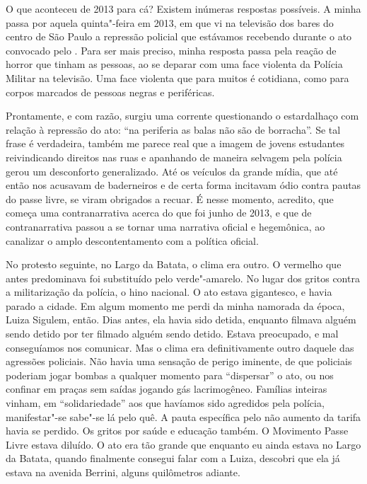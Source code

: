 O que aconteceu de 2013 para cá? Existem inúmeras respostas possíveis. A
minha passa por aquela quinta"-feira em 2013, em que vi na televisão dos
bares do centro de São Paulo a repressão policial que estávamos recebendo
durante o ato convocado pelo . Para ser mais preciso, minha resposta
passa pela reação de horror que tinham as pessoas, ao se deparar com uma
face violenta da Polícia Militar na televisão. Uma face violenta que
para muitos é cotidiana, como para corpos marcados de pessoas
negras e periféricas.

Prontamente, e com razão, surgiu uma corrente questionando o estardalhaço com relação à repressão do ato: ``na periferia as balas não são de borracha''. Se tal frase é verdadeira, também me parece real que a imagem de jovens estudantes reivindicando direitos nas ruas e apanhando de maneira selvagem pela polícia gerou um desconforto generalizado. Até os veículos da grande mídia, que até então nos
acusavam de baderneiros e de certa forma incitavam ódio contra pautas
do passe livre, se viram obrigados a recuar. É nesse momento,
acredito, que começa uma contranarrativa acerca do que foi junho de
2013, e que de contranarrativa passou a se tornar uma narrativa oficial
e hegemônica, ao canalizar o amplo descontentamento com a política
oficial.

No protesto seguinte, no Largo da Batata, o clima era outro. O vermelho
que antes predominava foi substituído pelo verde"-amarelo. No lugar dos
gritos contra a militarização da polícia, o hino nacional. O ato estava
gigantesco, e havia parado a cidade. Em algum momento me perdi da minha
namorada da época, Luiza Sigulem, então. Dias antes, ela havia sido
detida, enquanto filmava alguém sendo detido por ter filmado alguém
sendo detido. Estava preocupado, e mal conseguíamos nos comunicar. Mas o
clima era definitivamente outro daquele das agressões policiais. Não
havia uma sensação de perigo iminente, de que policiais poderiam jogar
bombas a qualquer momento para ``dispersar'' o ato, ou nos confinar em
praças sem saídas jogando gás lacrimogêneo. Famílias inteiras vinham, em
``solidariedade'' aos que havíamos sido agredidos pela polícia,
manifestar"-se sabe"-se lá pelo quê. A pauta específica pelo não aumento da
tarifa havia se perdido. Os gritos por saúde e educação também. O
Movimento Passe Livre estava diluído. O ato era tão grande que enquanto
eu ainda estava no Largo da Batata, quando finalmente consegui falar com
a Luiza, descobri que ela já estava na avenida Berrini, alguns
quilômetros adiante.

